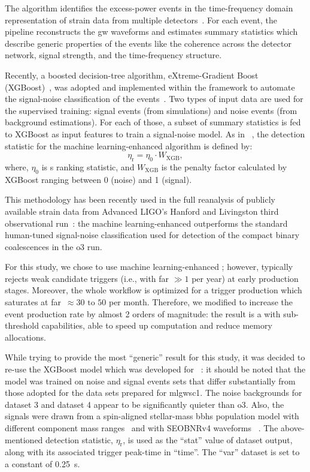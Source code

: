 The \cwb algorithm identifies the excess-power events in the time-frequency domain representation of strain data from multiple detectors~\cite{Klimenko:2015ypf,Klimenko:2004qh}. For each event, the \cwb pipeline reconstructs the \acrshort{gw} waveforms and estimates summary statistics which describe generic properties of the events like the coherence across the detector network, signal strength, and the time-frequency structure.
 
Recently, a boosted decision-tree algorithm, eXtreme-Gradient Boost (XGBoost)~\cite{XGBoost}, was adopted and implemented within the \cwb framework to automate the signal-noise classification of the \cwb events~\cite{Mishra:2021tmu}. Two types of input data are used for the supervised training: signal events (from simulations) and noise events (from background estimations). For each of those, a subset of \cwb summary statistics is fed to XGBoost as input features to train a signal-noise model.  
As in ~\cite{Mishra:2021tmu}, the detection statistic for the machine learning-enhanced \cwb algorithm is defined by:
\begin{equation}\label{eq:x}
	\eta_\mathrm{r} = \eta_\mathrm{0}\cdot W_{\mathrm{XGB}}, 
\end{equation}
where, $\eta_\mathrm{0}$ is {\cwb}s ranking statistic, and $W_{\mathrm{XGB}}$ is the penalty factor calculated by XGBoost ranging between 0 (noise) and 1 (signal). 

This methodology has been recently used in the full reanalysis of publicly available strain data from Advanced LIGO’s Hanford and Livingston third observational run~\cite{Mishra:2022ott}: the machine learning-enhanced \cwb outperforms the standard human-tuned signal-noise classification used for detection of the compact binary coalescences in the \acrshort{o3} run.

For this study, we chose to use machine learning-enhanced \cwb; however, \cwb typically rejects weak candidate triggers (i.e., with \acrshort{far} $\gg 1$ per year) at early production stages. Moreover, the whole workflow is optimized for a trigger production which saturates at \acrshort{far}~$\approx 30 \text{ to } 50$ per month.  Therefore, we modified \cwb to increase the event production rate by almost 2 orders of magnitude: the result is a \cwb with sub-threshold capabilities, able to speed up computation and reduce memory allocations.

While trying to provide the most ``generic'' result for this study, it was decided to re-use the XGBoost model which was developed for ~\cite{Mishra:2022ott}: it should be noted that the model was trained on noise and signal events sets that differ substantially from those adopted for the data sets prepared for \acrshort{mlgwsc1}. The noise backgrounds for dataset 3 and dataset 4 appear to be significantly quieter than \acrshort{o3}. Also, the signals were drawn from a spin-aligned stellar-mass \acrshort{bbh}s population model with different component mass ranges~\cite{PowerLawPeak} and with SEOBNRv4 waveforms ~\cite{Bohe:2016gbl}.
The above-mentioned detection statistic, $\eta_\mathrm{r}$, is used as the ``stat'' value of dataset output, along with its associated trigger peak-time in ``time''. The ``var'' dataset is set to a constant of \SI{0.25}{\second}.

